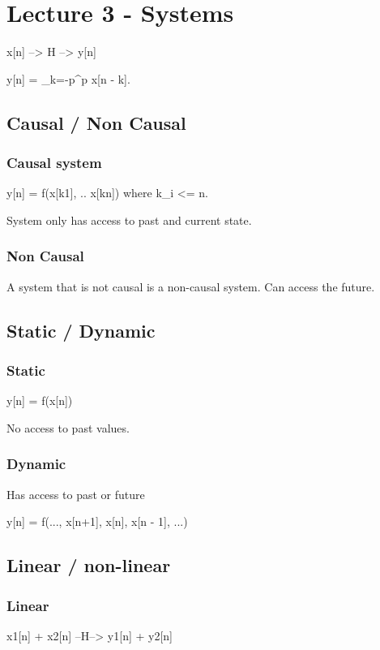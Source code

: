 \documentclass{article}
\begin{document}
\section{Lecture 3 - Systems}

x[n] --> H --> y[n]


y[n] = \sum_{k=-p}^{p} x[n - k].

\subsection{Causal / Non Causal}

\subsubsection{Causal system}

y[n] = f(x[k1], .. x[kn]) where k_i <= n.

System only has access to past and current state.

\subsubsection{Non Causal}
A system that is not causal is a non-causal system. Can access the future.


\subsection{Static / Dynamic}
\subsubsection{Static}

y[n] = f(x[n])

No access to past values.

\subsubsection{Dynamic}

Has access to past or future

y[n] = f(..., x[n+1], x[n], x[n - 1], ...)



\subsection{Linear / non-linear}
\subsubsection{Linear}
x1[n] + x2[n] --H--> y1[n] + y2[n]
\end{document}

